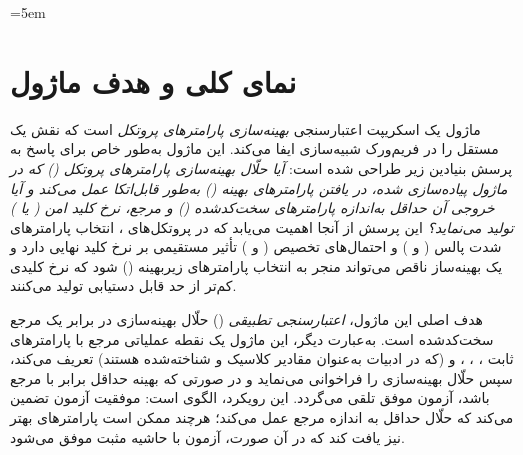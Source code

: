 \sloppy
\emergencystretch=5em



\section{نمای کلی و هدف ماژول}

ماژول  یک اسکریپت اعتبارسنجی \emph{بهینه‌سازی پارامترهای پروتکل} است که نقش یک  مستقل را در فریم‌ورک شبیه‌سازی  ایفا می‌کند. این ماژول به‌طور خاص برای پاسخ به پرسش بنیادین زیر طراحی شده است: \emph{آیا حلّال بهینه‌سازی پارامترهای پروتکل  () که در ماژول  پیاده‌سازی شده، در یافتن پارامترهای بهینه () به‌طور قابل‌اتکا عمل می‌کند و آیا خروجی آن حداقل به‌اندازه پارامترهای سخت‌کدشده () و مرجع، نرخ کلید امن ( یا ) تولید می‌نماید؟} این پرسش از آنجا اهمیت می‌یابد که در پروتکل‌های ، انتخاب پارامترهای شدت پالس (\lr{$\mu$} و \lr{$\nu$}) و احتمال‌های تخصیص ( و ) تأثیر مستقیمی بر نرخ کلید نهایی دارد و یک بهینه‌ساز ناقص می‌تواند منجر به انتخاب پارامترهای زیربهینه () شود که نرخ کلیدی کم‌تر از حد قابل دستیابی تولید می‌کنند.

هدف اصلی این ماژول، \emph{اعتبارسنجی تطبیقی} () حلّال بهینه‌سازی در برابر یک مرجع سخت‌کدشده است. به‌عبارت دیگر، این ماژول یک نقطه عملیاتی مرجع با پارامترهای ثابت ، ، ،  و  (که در ادبیات  به‌عنوان مقادیر کلاسیک و شناخته‌شده هستند) تعریف می‌کند، سپس حلّال بهینه‌سازی را فراخوانی می‌نماید و در صورتی که  بهینه حداقل برابر با  مرجع باشد، آزمون موفق تلقی می‌گردد. این رویکرد، الگوی  است: موفقیت آزمون تضمین می‌کند که حلّال حداقل به اندازه مرجع عمل می‌کند؛ هرچند ممکن است پارامترهای بهتر نیز یافت کند که در آن صورت، آزمون با حاشیه مثبت موفق می‌شود.

